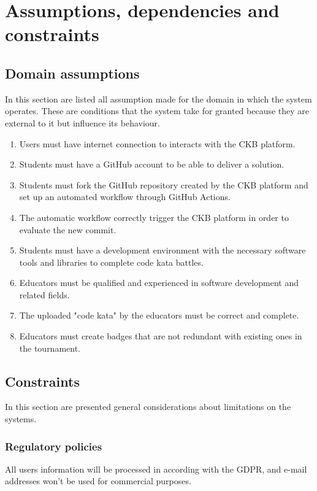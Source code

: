 \section{Assumptions, dependencies and constraints}

\subsection{Domain assumptions}
In this section are listed all assumption made for the domain in which the system operates. These are conditions that the system take for granted because they are external to it but influence its behaviour.
\begin{enumerate}[label=\textbf{DA.\arabic*}]
        \item {} {Users must have internet connection to interacts with the CKB platform.}
        \item {} {Students must have a GitHub account to be able to deliver a solution.}
        \item {} {Students must fork the GitHub repository created by the CKB platform and set up an automated workflow through GitHub Actions.}
        \item {} {The automatic workflow correctly trigger the CKB platform in order to evaluate the new commit.}
        \item {} {Students must have a development environment with the necessary software tools and libraries to complete code kata battles.}
        \item {} {Educators must be qualified and experienced in software development and related fields.}
        \item {} {The uploaded "code kata" by the educators must be correct and complete.}
        \item {} {Educators must create badges that are not redundant with existing ones in the tournament.}
\end{enumerate}

\subsection{Constraints}
In this section are presented general considerations about limitations on the systems.

\subsubsection*{Regulatory policies}
All users information will be processed in according with the GDPR, and e-mail addresses won't be used for commercial purposes.
